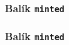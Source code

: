 \subsubsection{Balík \texttt{minted}}
\begin{frame}
	\frametitle{Balík \texttt{minted}}
\end{frame}

\endinput
